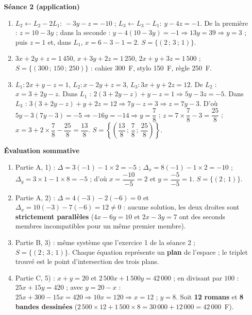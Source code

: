 \documentclass[a4paper,11pt]{article}
\begin{document}
\noindent\textbf{Séance 2 (application)}
\begin{enumerate}[leftmargin=*, itemsep=3pt]
  \item $L_2\leftarrow L_2-2L_1:\ -3y-z=-10$ ; $L_3\leftarrow L_3-L_1:\ y-4z=-1$.
        De la première : $z=10-3y$ ; dans la seconde :
        $y-4(10-3y)=-1 \Rightarrow 13y=39 \Rightarrow y=3$ ; puis $z=1$ et,
        dans $L_1$, $x=6-3-1=2$. \quad $S=\{(2\,;\,3\,;\,1)\}$.
  \item $3x+2y+z=1\,450$, $x+3y+2z=1\,250$, $2x+y+3z=1\,500$ ;
        $S=\{(300\,;\,150\,;\,250)\}$ : cahier 300~F, stylo 150~F, règle 250~F.
  \item $L_1:2x+y-z=1$, $L_2:x-2y+z=3$, $L_3:3x+y+2z=12$.
        De $L_2$ : $x=3+2y-z$. Dans $L_1$ : $2(3+2y-z)+y-z=1 \Rightarrow 5y-3z=-5$.
        Dans $L_3$ : $3(3+2y-z)+y+2z=12 \Rightarrow 7y-z=3 \Rightarrow z=7y-3$.
        D'où $5y-3(7y-3)=-5 \Rightarrow -16y=-14 \Rightarrow y=\dfrac{7}{8}$ ;
        $z=7\times\dfrac{7}{8}-3=\dfrac{25}{8}$ ;
        $x=3+2\times\dfrac{7}{8}-\dfrac{25}{8}=\dfrac{13}{8}$.
        \quad $S=\left\{\left(\dfrac{13}{8}\,;\,\dfrac{7}{8}\,;\,\dfrac{25}{8}\right)\right\}$.
\end{enumerate}

\noindent\textbf{Évaluation sommative}
\begin{enumerate}[leftmargin=*, itemsep=3pt]
  \item Partie A, 1) : $\Delta=3(-1)-1\times2=-5$ ; $\Delta_x=8(-1)-1\times2=-10$ ;
        $\Delta_y=3\times1-1\times8=-5$ ; d'où $x=\dfrac{-10}{-5}=2$ et
        $y=\dfrac{-5}{-5}=1$. \quad $S=\{(2\,;\,1)\}$.
  \item Partie A, 2) : $\Delta=4(-3)-2(-6)=0$ et
        $\Delta_x=10(-3)-7(-6)=12\neq0$ : aucune solution, les deux droites sont
        \textbf{strictement parallèles} ($4x-6y=10$ et $2x-3y=7$ ont des
        seconds membres incompatibles pour un même premier membre).
  \item Partie B, 3) : même système que l'exercice 1 de la séance 2 ;
        $S=\{(2\,;\,3\,;\,1)\}$. Chaque équation représente un \textbf{plan} de
        l'espace ; le triplet trouvé est le point d'intersection des trois plans.
  \item Partie C, 5) : $x+y=20$ et $2\,500x+1\,500y=42\,000$ ; en divisant par
        $100$ : $25x+15y=420$ ; avec $y=20-x$ : $25x+300-15x=420 \Rightarrow
        10x=120 \Rightarrow x=12$ ; $y=8$. Soit \textbf{12 romans} et
        \textbf{8 bandes dessinées}
        ($2\,500\times12+1\,500\times8=30\,000+12\,000=42\,000$~F).
\end{enumerate}

\vspace{6pt}
\end{document}

